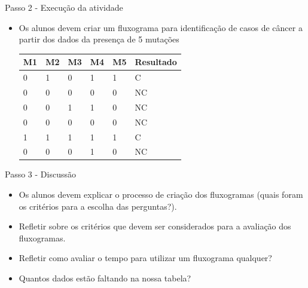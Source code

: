 \documentclass{beamer}
\begin{document}

\begin{frame}{Passo 2 - Execução da atividade}

\begin{itemize}

\item <1-> Os alunos devem criar um fluxograma para identificação de casos de câncer a partir dos dados da presença de 5 mutações


\begin{center}
\begin{tabular}{|l|l|l|l|l|l|}
\hline
M1 & M2 & M3 & M4 & M5 & Resultado\\
\hline
0 & 1 & 0 & 1 & 1 & C\\
0 & 0 & 0 & 0 & 0 & NC\\
0 & 0 & 1 & 1 & 0 & NC\\
0 & 0 & 0 & 0 & 0 & NC\\
1 & 1 & 1 & 1 & 1 & C\\
0 & 0 & 0 & 1 & 0 & NC\\
\hline
\end{tabular}
\end{center}

\end{itemize}


\end{frame}


\begin{frame}{Passo 3 - Discussão}

\begin{itemize}

\item <1-> Os alunos devem explicar o processo de criação dos fluxogramas (quais foram os critérios para a escolha das perguntas?).

\item <2-> Refletir sobre os critérios que devem ser considerados para a avaliação dos fluxogramas.

\item <3-> Refletir como avaliar o tempo para utilizar um fluxograma qualquer?

\item <4-> Quantos dados estão faltando na nossa tabela?





\end{itemize}


\end{frame}
\end{document}
